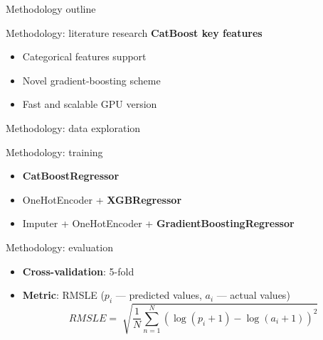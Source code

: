 \begin{frame}{Methodology}
	outline
\end{frame}

\begin{frame}{Methodology: literature research}
	\textbf{CatBoost key features}
	\begin{itemize}
		\item Categorical features support
		\item Novel gradient-boosting scheme
		\item Fast and scalable GPU version
	\end{itemize}
\end{frame}

\begin{frame}{Methodology: data exploration}
	\begin{table}
		\centering
	\end{table}
\end{frame}

\begin{frame}{Methodology: training}
	\begin{itemize}
		\item \textbf{CatBoostRegressor}
		\item OneHotEncoder + \textbf{XGBRegressor}
		\item Imputer + OneHotEncoder + \textbf{GradientBoostingRegressor}
	\end{itemize}
	
\end{frame}

\begin{frame}{Methodology: evaluation}
	\begin{itemize}
		\item \textbf{Cross-validation}: 5-fold
		\item \textbf{Metric}: RMSLE ($p_i$ --- predicted values, $a_i$ --- actual values)
		$$ RMSLE = \sqrt[]{\frac{1}{N}\sum_{n = 1}^N (\log(p_i + 1) - \log(a_i + 1))^2} $$
	\end{itemize}
\end{frame}

